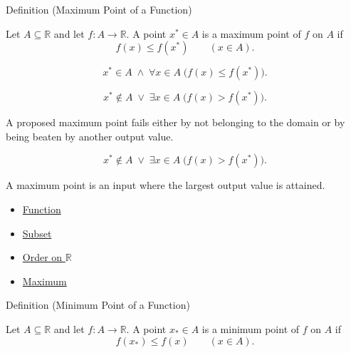 \begin{definitionbox}{Definition (Maximum Point of a Function)}
\begin{definition}
\label{def:function-maximum-point}
Let $A\subseteq\mathbb{R}$ and let $f:A\to\mathbb{R}$.  A point
$x^*\in A$ is a maximum point of $f$ on $A$ if
\[
  f(x)\leq f(x^*)
  \qquad (x\in A).
\]
\end{definition}
\end{definitionbox}

\begin{remark*}
\[
  x^*\in A\;\wedge\;\forall x\in A\;\bigl(f(x)\leq f(x^*)\bigr).
\]
\end{remark*}

\begin{remark*}
\[
  x^*\notin A\;\vee\;\exists x\in A\;\bigl(f(x)>f(x^*)\bigr).
\]
\end{remark*}

\begin{remark*}
A proposed maximum point fails either by not belonging to the domain or by
being beaten by another output value.
\end{remark*}

\begin{remark*}
\[
  x^*\notin A
  \;\vee\;
  \exists x\in A\;\bigl(f(x)>f(x^*)\bigr).
\]
\end{remark*}

\begin{remark*}[Interpretation]
A maximum point is an input where the largest output value is attained.
\end{remark*}

\begin{dependencies}
\begin{itemize}
  \item \hyperref[def:function]{Function}
  \item \hyperref[def:subset]{Subset}
  \item \hyperref[def:order-on-r]{Order on $\mathbb{R}$}
  \item \hyperref[def:maximum]{Maximum}
\end{itemize}
\end{dependencies}

\begin{definitionbox}{Definition (Minimum Point of a Function)}
\begin{definition}
\label{def:function-minimum-point}
Let $A\subseteq\mathbb{R}$ and let $f:A\to\mathbb{R}$.  A point
$x_*\in A$ is a minimum point of $f$ on $A$ if
\[
  f(x_*)\leq f(x)
  \qquad (x\in A).
\]
\end{definition}
\end{definitionbox}

